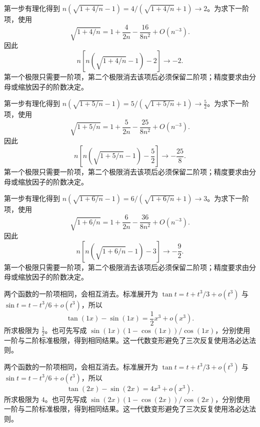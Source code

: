 \documentclass[UTF8,12pt,a4paper,fontset=fandol]{ctexart}
\begin{document}
\begin{solve}\label{ans:c5q10}
第一步有理化得到 $n(\sqrt{1+4/n}-1)=4/(\sqrt{1+4/n}+1)\to 2$。为求下一阶项，使用
\[
\sqrt{1+4/n}=1+\frac{4}{2n}-\frac{16}{8n^2}+O(n^{-3}).
\]
因此
\[
n\left[n\left(\sqrt{1+4/n}-1\right)-2\right]\longrightarrow-2.
\]
第一个极限只需要一阶项，第二个极限消去该项后必须保留二阶项；精度要求由分母或缩放因子的阶数决定。
\end{solve}

\begin{solve}\label{ans:c5q11}
第一步有理化得到 $n(\sqrt{1+5/n}-1)=5/(\sqrt{1+5/n}+1)\to \frac{5}{2}$。为求下一阶项，使用
\[
\sqrt{1+5/n}=1+\frac{5}{2n}-\frac{25}{8n^2}+O(n^{-3}).
\]
因此
\[
n\left[n\left(\sqrt{1+5/n}-1\right)-\frac{5}{2}\right]\longrightarrow-\frac{25}{8}.
\]
第一个极限只需要一阶项，第二个极限消去该项后必须保留二阶项；精度要求由分母或缩放因子的阶数决定。
\end{solve}

\begin{solve}\label{ans:c5q12}
第一步有理化得到 $n(\sqrt{1+6/n}-1)=6/(\sqrt{1+6/n}+1)\to 3$。为求下一阶项，使用
\[
\sqrt{1+6/n}=1+\frac{6}{2n}-\frac{36}{8n^2}+O(n^{-3}).
\]
因此
\[
n\left[n\left(\sqrt{1+6/n}-1\right)-3\right]\longrightarrow-\frac{9}{2}.
\]
第一个极限只需要一阶项，第二个极限消去该项后必须保留二阶项；精度要求由分母或缩放因子的阶数决定。
\end{solve}

\begin{solve}\label{ans:c5q13}
两个函数的一阶项相同，会相互消去。标准展开为 $\tan t=t+t^3/3+o(t^3)$ 与 $\sin t=t-t^3/6+o(t^3)$，所以
\[
\tan(1x)-\sin(1x)=\frac{1}{2}x^3+o(x^3).
\]
所求极限为 $\frac{1}{2}$。也可先写成 $\sin(1x)(1-\cos(1x))/\cos(1x)$，分别使用一阶与二阶标准极限，得到相同结果。这一代数变形避免了三次反复使用洛必达法则。
\end{solve}

\begin{solve}\label{ans:c5q14}
两个函数的一阶项相同，会相互消去。标准展开为 $\tan t=t+t^3/3+o(t^3)$ 与 $\sin t=t-t^3/6+o(t^3)$，所以
\[
\tan(2x)-\sin(2x)=4x^3+o(x^3).
\]
所求极限为 $4$。也可先写成 $\sin(2x)(1-\cos(2x))/\cos(2x)$，分别使用一阶与二阶标准极限，得到相同结果。这一代数变形避免了三次反复使用洛必达法则。
\end{solve}
\end{document}
